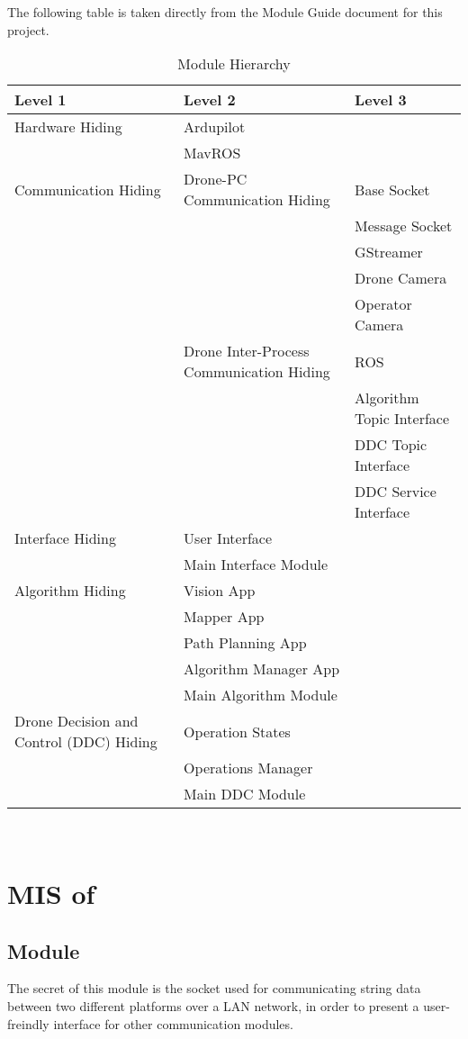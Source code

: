 \documentclass[12pt, titlepage]{article}
\begin{document}
The following table is taken directly from the Module Guide document for this project.

\begin{table}[h!]
\centering
\begin{tabular}{p{} p{}  p{}}
\toprule
\textbf{Level 1} & \textbf{Level 2} & 
\textbf{Level 3}\\
\midrule
{Hardware Hiding} & 
Ardupilot \\
& MavROS \\
\midrule
Communication Hiding &
Drone-PC Communication Hiding & Base Socket \\
 && Message Socket \\
 && GStreamer \\
 && Drone Camera \\
 && Operator Camera \\
 &{Drone Inter-Process Communication Hiding} 
& ROS \\
&& Algorithm Topic Interface \\
&& DDC Topic Interface \\
&& DDC Service Interface \\
\midrule
Interface Hiding
& User Interface \\
& Main Interface Module \\
\midrule
{Algorithm Hiding} 
& Vision App \\
& Mapper App \\
& Path Planning App \\
& Algorithm Manager App \\
& Main Algorithm Module \\
\midrule
{Drone Decision and Control (DDC) Hiding} 
& Operation States \\
& Operations Manager \\
& Main DDC Module \\
\midrule
\end{tabular}
\caption{Module Hierarchy}
\label{TblMH}
\end{table}

~\newpage

\section{MIS of } \label{MIS_MESSAGE_SOCKET} 
\subsection{Module}
The secret of this module is the socket used for communicating string data between two different platforms over a LAN network, in order to present a user-freindly interface for other communication modules.
\end{document}
